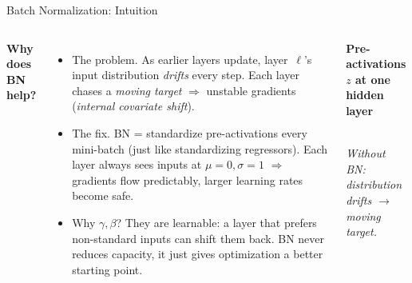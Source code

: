 \documentclass[aspectratio=169,11pt]{beamer}
\newcommand{\emphc}[1]{\textcolor{harvardcrimson}{#1}}
\begin{document}
\begin{frame}{Batch Normalization: Intuition}
\begin{columns}[T]
\textbf{Why does BN help?}
\begin{itemize}\itemsep3pt
    \item[\textcolor{harvardcrimson}{$\blacktriangleright$}] {\small \emphc{The problem.} As earlier layers update, layer~$\ell$'s input distribution \emph{drifts} every step. Each layer chases a \textit{moving target} $\Rightarrow$ unstable gradients (\textit{internal covariate shift}).}
    \item[\textcolor{harvardcrimson}{$\blacktriangleright$}] {\small \emphc{The fix.} BN = standardize pre-activations every mini-batch (just like standardizing regressors). Each layer always sees inputs at $\mu{=}0,\sigma{=}1$ $\Rightarrow$ gradients flow predictably, larger learning rates become safe.}
    \item[\textcolor{harvardcrimson}{$\blacktriangleright$}] {\small \emphc{Why $\gamma,\beta$?} They are learnable: a layer that prefers non-standard inputs can shift them back. BN never reduces capacity, it just gives optimization a better starting point.}
\end{itemize}

\begin{center}
{\small\textbf{Pre-activations $z$ at one hidden layer}}\\[0.05cm]

\\[-0.1cm]
{\scriptsize\itshape Without BN: distribution drifts $\to$ moving target.}


\end{center}
\end{columns}
\end{frame}
\end{document}
